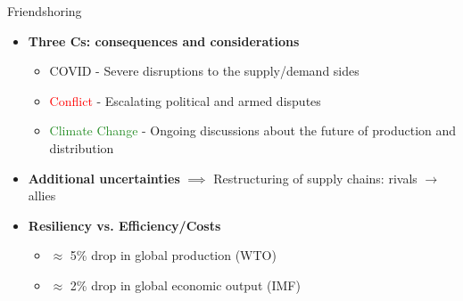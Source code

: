 \documentclass[10pt,xcolor={dvipsnames}]{beamer}
\begin{document}
\begin{frame}{Friendshoring}
    \begin{itemize}\itemsep3.4ex
        \item[\ding{213}] \textbf{Three Cs: consequences and considerations}
            \begin{itemize}\itemsep1ex
                    \item \textcolor{NavyBlue}{COVID} - Severe disruptions to the supply/demand sides 
                    \item \textcolor{red}{Conflict} - Escalating political and armed disputes  
                    \item \textcolor{ForestGreen}{Climate Change} - Ongoing discussions about the future of production and distribution
                   
            \end{itemize} \pause
        \item[\ding{213}] \textbf{Additional uncertainties} $\implies$ Restructuring of supply chains: rivals $\rightarrow$ allies \pause
        \item[\ding{213}] \textbf{Resiliency vs. Efficiency/Costs}
            \begin{itemize}\itemsep1ex
                \item $\approx$ 5\% drop in global production (WTO)
                \item $\approx$ 2\% drop in global economic output (IMF)
            \end{itemize}
    \end{itemize}
\end{frame}
\end{document}
